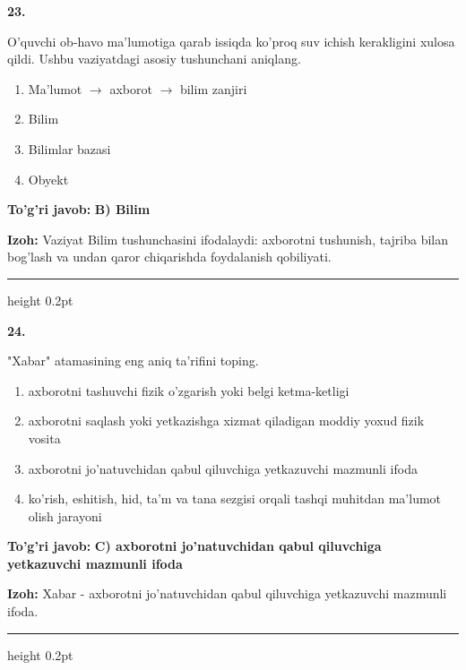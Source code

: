 \documentclass[10pt,a4paper,oneside]{article}
\begin{document}
\noindent\textbf{\color{ink}23.}
\par
O'quvchi ob-havo ma'lumotiga qarab issiqda ko'proq suv ichish kerakligini xulosa qildi. Ushbu vaziyatdagi asosiy tushunchani aniqlang.
\begin{enumerate}[label=\Alph*),leftmargin=9mm]
\item Ma'lumot \ensuremath{\to} axborot \ensuremath{\to} bilim zanjiri
\item Bilim
\item Bilimlar bazasi
\item Obyekt
\end{enumerate}
\begin{tcolorbox}[enhanced,breakable,colback=teal!4,colframe=teal!50!black,boxrule=0.5pt,arc=1.1mm,left=3mm,right=3mm,top=1.7mm,bottom=1.7mm,before skip=2mm,after skip=2mm]
\textbf{\color{teal}To'g'ri javob:} \textbf{B) Bilim}
\par\smallskip
\textbf{Izoh:} Vaziyat Bilim tushunchasini ifodalaydi: axborotni tushunish, tajriba bilan bog'lash va undan qaror chiqarishda foydalanish qobiliyati.
\end{tcolorbox}
\vspace{2mm}\hrule height 0.2pt \vspace{3mm}

\noindent\textbf{\color{ink}24.}
\par
"Xabar" atamasining eng aniq ta'rifini toping.
\begin{enumerate}[label=\Alph*),leftmargin=9mm]
\item axborotni tashuvchi fizik o'zgarish yoki belgi ketma-ketligi
\item axborotni saqlash yoki yetkazishga xizmat qiladigan moddiy yoxud fizik vosita
\item axborotni jo'natuvchidan qabul qiluvchiga yetkazuvchi mazmunli ifoda
\item ko'rish, eshitish, hid, ta'm va tana sezgisi orqali tashqi muhitdan ma'lumot olish jarayoni
\end{enumerate}
\begin{tcolorbox}[enhanced,breakable,colback=teal!4,colframe=teal!50!black,boxrule=0.5pt,arc=1.1mm,left=3mm,right=3mm,top=1.7mm,bottom=1.7mm,before skip=2mm,after skip=2mm]
\textbf{\color{teal}To'g'ri javob:} \textbf{C) axborotni jo'natuvchidan qabul qiluvchiga yetkazuvchi mazmunli ifoda}
\par\smallskip
\textbf{Izoh:} Xabar - axborotni jo'natuvchidan qabul qiluvchiga yetkazuvchi mazmunli ifoda.
\end{tcolorbox}
\vspace{2mm}\hrule height 0.2pt \vspace{3mm}
\end{document}
